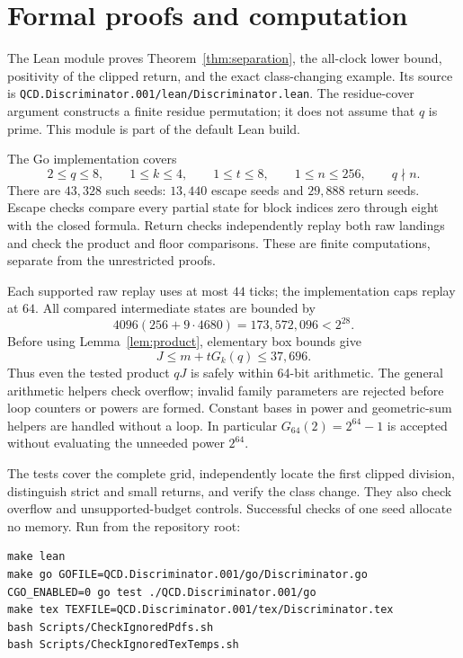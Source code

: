 \documentclass[11pt,letterpaper]{article}
\begin{document}
\section{Formal proofs and computation}

The Lean module proves Theorem~\ref{thm:separation}, the all-clock lower bound,
positivity of the clipped return, and the exact class-changing example.
Its source is \texttt{QCD.Discriminator.001/lean/Discriminator.lean}. The residue-cover
argument constructs a finite residue permutation; it does not assume that
\(q\) is prime. This module is part of the default Lean build.

The Go implementation covers
\[
2\le q\le8,\qquad 1\le k\le4,\qquad1\le t\le8,\qquad1\le n\le256,
\qquad q\nmid n.
\]
There are \(43{,}328\) such seeds: \(13{,}440\) escape seeds and \(29{,}888\)
return seeds. Escape checks compare every partial state for block indices
zero through eight with the closed formula. Return checks independently
replay both raw landings and check the product and floor comparisons.
These are finite computations, separate from the unrestricted proofs.

Each supported raw replay uses at most \(44\) ticks; the implementation caps
replay at \(64\). All compared intermediate states are bounded by
\[
4096(256+9\cdot4680)=173{,}572{,}096<2^{28}.
\]
Before using Lemma~\ref{lem:product}, elementary box bounds give
\[
J\le m+tG_k(q)\le37{,}696.
\]
Thus even the tested product \(qJ\) is safely within 64-bit arithmetic. The general arithmetic helpers check overflow; invalid
family parameters are rejected before loop counters or powers are formed.
Constant bases in power and geometric-sum helpers are handled without a
loop. In particular \(G_{64}(2)=2^{64}-1\) is accepted without evaluating the
unneeded power \(2^{64}\).

The tests cover the complete grid, independently locate the first clipped
division, distinguish strict and small returns, and verify the class change.
They also check overflow and unsupported-budget controls. Successful
checks of one seed allocate no memory. Run from the repository root:
\begin{verbatim}
make lean
make go GOFILE=QCD.Discriminator.001/go/Discriminator.go
CGO_ENABLED=0 go test ./QCD.Discriminator.001/go
make tex TEXFILE=QCD.Discriminator.001/tex/Discriminator.tex
bash Scripts/CheckIgnoredPdfs.sh
bash Scripts/CheckIgnoredTexTemps.sh
\end{verbatim}
\end{document}

